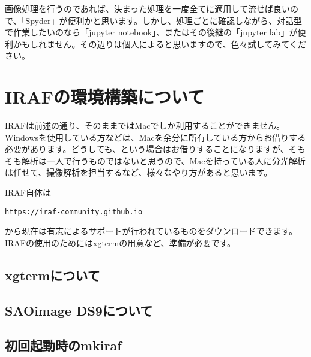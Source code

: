 画像処理を行うのであれば、決まった処理を一度全てに適用して流せば良いので、「Spyder」が便利かと思います。しかし、処理ごとに確認しながら、対話型で作業したいのなら「jupyter notebook」、またはその後継の「jupyter lab」が便利かもしれません。その辺りは個人によると思いますので、色々試してみてください。

\section{IRAFの環境構築について}
\label{sec_1_6}
IRAFは前述の通り、そのままではMacでしか利用することができません。Windowsを使用している方などは、Macを余分に所有している方からお借りする必要があります。どうしても、という場合はお借りすることになりますが、そもそも解析は一人で行うものではないと思うので、Macを持っている人に分光解析は任せて、撮像解析を担当するなど、様々なやり方があると思います。

IRAF自体は
\begin{verbatim}
https://iraf-community.github.io
\end{verbatim}
から現在は有志によるサポートが行われているものをダウンロードできます。IRAFの使用のためにはxgtermの用意など、準備が必要です。

\subsection{xgtermについて}
\label{subsec_1_6_1}

\subsection{SAOimage DS9について}
\label{subsec_1_6_2}

\subsection{初回起動時のmkiraf}
\label{subsec_1_6_3}